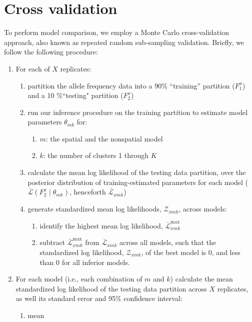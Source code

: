 \documentclass[12pt]{article}
\begin{document}
\newpage
\section{Cross validation}
To perform model comparison, we employ a Monte Carlo cross-validation approach,
also known as repeated random sub-sampling validation.
Briefly, we follow the following procedure:
\begin{enumerate}
\item For each of $X$ replicates:
	\begin{enumerate}
		\item partition the allele frequency data into a 90\% ``training'' partition ($F^x_1$) and a 10 \%``testing" partition ($F^x_2$) \label{partition}
		\item run our inference procedure on the training partition to estimate model parameters $\theta_{mk}$ for: \label{inference}
			\begin{enumerate}
				\item $m$: the spatial and the nonspatial model
				\item $k$: the number of clusters 1 through $K$
			\end{enumerate}	
	\item calculate the mean log likelihood of the testing data partition, 
	over the posterior distribution of training-estimated parameters for each model 
	($\bar{\mathcal{L}}(F^x_2 \mid \theta_{mk})$, henceforth $\bar{\mathcal{L}}_{xmk}$) \label{lnL}
	\item generate standardized mean log likelihoods, $\mathcal{Z}_{xmk}$, across models: \label{standardize}
		\begin{enumerate}
			\item identify the highest mean log likelihood, $\bar{\mathcal{L}}^\text{max}_{xmk}$
			\item subtract $\bar{\mathcal{L}}^\text{max}_{xmk}$ from $\bar{\mathcal{L}}_{xmk}$ across all models,
				such that the standardized log likelihood, $\mathcal{Z}_{xmk}$, of the best model is 0,
				and less than 0 for all inferior models. 
		\end{enumerate}
	\end{enumerate}
\item For each model (i.e., each combination of $m$ and $k$) calculate 
	the mean standardized log likelihood of the testing data partition across $X$ replicates, 
	as well its standard error and 95\% confidence interval:
	\begin{enumerate}
	\item mean

\end{enumerate}
\end{enumerate}
\end{document}
